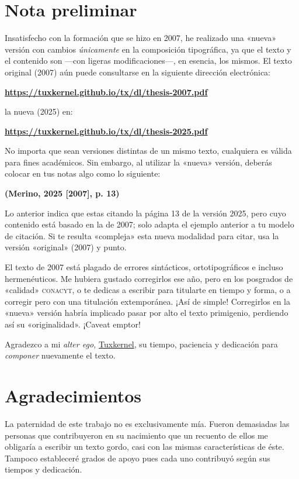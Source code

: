 \documentclass[14pt,twoside,final]{extbook} %
\begin{document}
\chapter*{Nota preliminar}
\label{ch:nota-preliminar}
Insatisfecho con la formación que se hizo en 2007, he realizado una «nueva» versión con cambios \emph{únicamente} en la composición tipográfica, ya que el texto y el contenido son ---con ligeras modificaciones---, en esencia, los mismos. El texto original (2007) aún puede consultarse en la siguiente dirección electrónica:
\begin{center}
\href{https://tuxkernel.github.io/tx/dl/thesis-2007.pdf}{\bfseries https://tuxkernel.github.io/tx/dl/thesis-2007.pdf}
\end{center}
la nueva (2025) en:
\begin{center}
\href{https://tuxkernel.github.io/tx/dl/thesis-2025.pdf}{\bfseries https://tuxkernel.github.io/tx/dl/thesis-2025.pdf}
\end{center}
No importa que sean versiones distintas de un mismo texto, cualquiera es válida para fines académicos. Sin embargo, al utilizar la «nueva» versión, deberás colocar en tus notas algo como lo siguiente:
\begin{center}
\bfseries (Merino, 2025 [2007], p. 13)
\end{center}
\noindent Lo anterior indica que estas citando la página 13 de la versión 2025, pero cuyo contenido está basado en la de 2007; solo adapta el ejemplo anterior a tu modelo de citación. Si te resulta «compleja» esta nueva modalidad para citar, usa la versión «original» (2007) y punto.

El texto de 2007 está plagado de errores sintácticos, ortotipográficos e incluso hermenéuticos. Me hubiera gustado corregirlos ese año, pero en los posgrados de «calidad» \textsc{conacyt}, o te dedicas a escribir para titularte en tiempo y forma, o a corregir pero con una titulación extemporánea. ¡Así de simple! Corregirlos en la «nueva» versión habría implicado pasar por alto el texto primigenio, perdiendo así su «originalidad». ¡Caveat emptor!

Agradezco a mi \emph{alter ego,} \href{muxkernel@gmail.com}{Tuxkernel}, su tiempo, paciencia y dedicación para \emph{componer} nuevamente el texto.
\chapter*{Agradecimientos}
\label{ch:agradecimientos}
\thispagestyle{empty}
\pagestyle{fancy}
\fancyhf{} %
\fancyhead[LE,RO]{\thepage} %
\renewcommand{\headrulewidth}{0pt}
La paternidad de este trabajo no es exclusivamente mía. Fueron demasiadas las personas que contribuyeron en su nacimiento que un recuento de ellos me obligaría a escribir un texto gordo, casi con las mismas características de éste. Tampoco estableceré grados de apoyo pues cada uno contribuyó según sus tiempos y dedicación.
\end{document}
